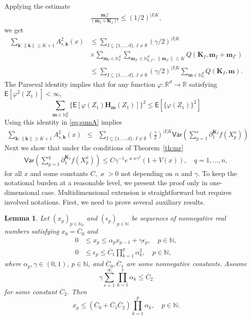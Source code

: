\documentclass[bj]{imsart}
\def\PE{\mathsf{E}}
\def\PVar{\mathsf{Var}}
\def\nset{\mathbb{N}}
\def\rset{\mathbb{R}}
\def\rset{\mathbb{R}}
\newtheorem{lem}[thm]{Lemma}
\newcommand*{\ol}{\overline}
\begin{document}
Applying the estimate
\begin{eqnarray*}
\frac{\mathbf{m}_{I}!}{\left(\mathbf{m}_{I}+\mathbf{K}_{I}\right)!}\leq (1/2)^{|I| K},
\end{eqnarray*}
we get
\begin{align}
\label{eq:sumA}
\sum_{\mathbf{k}\colon\|\mathbf{k}\|\geq K+1}A^2_{s,\mathbf{k}}(x)
&\leq
\sum_{I\subseteq\{1,\ldots,d\},\, I\neq \emptyset} (\gamma/2)^{|I|K}
\\
\nonumber
& \times\sum_{\mathbf{m}_{I}\in\mathbb{N}_{I}^{d}} \sum_{\mathbf{m}_{I^c}\in \mathbb{N}^d_{0,I^c},\,\|\mathbf{m}_{I^c}\|\leq K} Q(\mathbf{\mathbf{K}}_{I},\mathbf{m}_{I}+\mathbf{m}_{I^c})
\\
\nonumber
&\leq
\sum_{I\subseteq\{1,\ldots,d\},\, I\neq \emptyset} (\gamma/2)^{|I|K} \sum_{\mathbf{m}\in\mathbb{N}_0^{d}} Q(\mathbf{\mathbf{K}}_{I},\mathbf{m}).
\end{align}
The Parseval identity implies that for any function $\varphi: \rset^d \to \rset$ satisfying $\PE[\varphi^2(Z_1)] < \infty$,
\[
\sum_{\mathbf{m}\in \nset^d_0} \{\PE[\varphi(Z_1) \mathbf{H}_\mathbf{m}(Z_1)] \}^2 \le \PE[\{\varphi(Z_1)\}^2]
\]
Using this identity in \eqref{eq:sumA} implies
\begin{eqnarray*}
\sum_{\mathbf{k}\colon\|\mathbf{k}\|\geq K+1}A^2_{s,\mathbf{k}}(x)
&\leq & \sum_{I\subseteq\{1,\ldots,d\},\, I\neq \emptyset}
\left(\frac{\gamma}{2}\right)^{|I|K}
\PVar\left(\sum_{p=1}^{s}\partial_{1}^{\mathbf{K}_I}f\left(X^x_{p}\right)
\right)
\end{eqnarray*}
Next we show that under the conditions  of Theorem~\ref{th:mr}
\begin{eqnarray*}
\PVar\left(\sum_{p=1}^{q}\partial_{1}^{\mathbf{K}_I}f\left(X^x_{p}\right)
\right)\leq C\gamma^{-1}e^{\varkappa n\gamma^2}(1+V(x)),\quad q=1,\ldots,n,
\end{eqnarray*}
for all $x$ and some constants $C,\varkappa>0$  not depending on $n$ and $\gamma.$
To keep the notational burden at a reasonable level, we present the proof only in one-dimensional case.
Multidimensional extension is straightforward but requires involved notations.
First, we need to prove several auxiliary results.
\begin{lem}\label{lem:06062018a1}
Let $(x_p)_{p\in\mathbb N_0}$
and $(\epsilon_p)_{p\in\mathbb N}$
be sequences of nonnegative real numbers
satisfying $x_0=\ol C_0$ and
\begin{align}
0&\le x_p\le\alpha_p x_{p-1}+\gamma \epsilon_p,\quad p\in\mathbb N,
\label{eq:06062018a1}\\
0&\le\epsilon_p\le\ol C_1\prod_{k=1}^p \alpha_k^2,\quad p\in\mathbb N,
\label{eq:06062018a2}
\end{align}
where $\alpha_p,\gamma\in(0,1)$, $p\in\mathbb N$,
and $\ol C_0,\ol C_1$ are some nonnegative constants. Assume
\begin{equation}\label{eq:06062018a3}
\gamma \sum_{r=1}^\infty \prod_{k=1}^r \alpha_k\le\ol C_2
\end{equation}
for some constant $\ol C_2$. Then
$$
x_p\le(\ol C_0+\ol C_1\ol C_2)\prod_{k=1}^p \alpha_k,\quad p\in\mathbb N.
$$
\end{lem}
\end{document}
